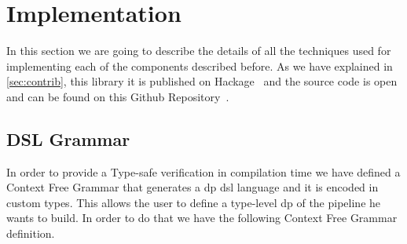 \section{Implementation}
In this section we are going to describe the details of all the techniques used for implementing each of the components described before.
As we have explained in \autoref{sec:contrib}, this library it is published on Hackage~\cite{dynamic-pipeline} and the source code is open 
and can be found on this Github Repository~\cite{dynamic-pipeline-git}.

\subsection{DSL Grammar}\label{sub:sec:dsl-gram}
In order to provide a Type-safe verification in compilation time we have defined a Context Free Grammar that generates a \acrshort{dp} \acrshort{dsl} language  
and it is encoded in custom types. This allows the user to define a type-level \acrshort{dp} of the pipeline he wants to build. 
In order to do that we have the following Context Free Grammar definition.

